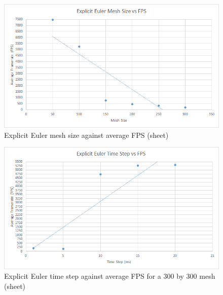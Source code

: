     \begin{figure}
    \begin{center}
      \includegraphics[scale=.9]{Figures/sheet_ee_m_fps}
    \end{center}
    \caption{Explicit Euler mesh size against average FPS (sheet)}
    \label{fig:ee mesh fps sheet}
  \end{figure}
  
    \begin{figure}
    \begin{center}
      \includegraphics[scale=.9]{Figures/sheet_ee_ts_fps}
    \end{center}
    \caption{Explicit Euler time step against average FPS for a 300 by 300 mesh (sheet)}
    \label{fig:ee step fps sheet}
  \end{figure}
  
